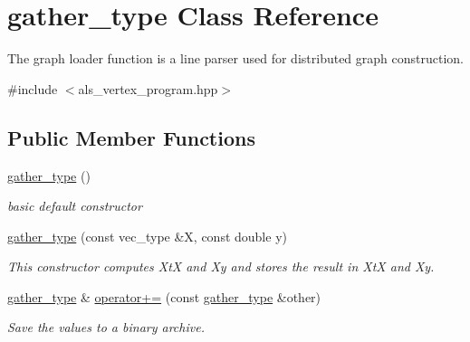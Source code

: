 \hypertarget{classgather__type}{\section{gather\-\_\-type Class Reference}
\label{classgather__type}
}


The graph loader function is a line parser used for distributed graph construction.  




{\ttfamily \#include $<$als\-\_\-vertex\-\_\-program.\-hpp$>$}

\subsection*{Public Member Functions}
\begin{DoxyCompactItemize}
\item 
\hypertarget{classgather__type_a0ef41a0943ab5f4348eaff240ba87774}{\hyperlink{classgather__type_a0ef41a0943ab5f4348eaff240ba87774}{gather\-\_\-type} ()}\label{classgather__type_a0ef41a0943ab5f4348eaff240ba87774}

\begin{DoxyCompactList}\small\item\em basic default constructor \end{DoxyCompactList}\item 
\hypertarget{classgather__type_aac64cb2fd36d4c39fad0816895df907b}{\hyperlink{classgather__type_aac64cb2fd36d4c39fad0816895df907b}{gather\-\_\-type} (const vec\-\_\-type \&X, const double y)}\label{classgather__type_aac64cb2fd36d4c39fad0816895df907b}

\begin{DoxyCompactList}\small\item\em This constructor computes Xt\-X and Xy and stores the result in Xt\-X and Xy. \end{DoxyCompactList}\item 
\hyperlink{classgather__type}{gather\-\_\-type} \& \hyperlink{classgather__type_a672f8aac3ab0b1bb48e857b77307f621}{operator+=} (const \hyperlink{classgather__type}{gather\-\_\-type} \&other)
\begin{DoxyCompactList}\small\item\em Save the values to a binary archive. \end{DoxyCompactList}\end{DoxyCompactItemize}
